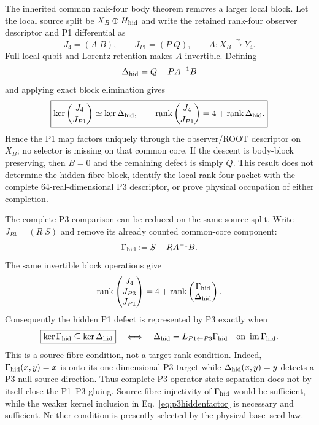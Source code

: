 \documentclass[11pt]{article}
\begin{document}
The inherited common rank-four body theorem removes a larger local block.
Let the local source split be $X_B\oplus H_{\rm hid}$ and write the retained
rank-four observer descriptor and P1 differential as
\begin{equation}
J_4=(A\;B),\qquad J_{P1}=(P\;Q),\qquad A:X_B\overset{\sim}{\longrightarrow}Y_4.
\end{equation}
Full local qubit and Lorentz retention makes $A$ invertible.  Defining
\begin{equation}
\Delta_{\rm hid}=Q-PA^{-1}B
\label{eq:hiddenfiberdefect}
\end{equation}
and applying exact block elimination gives
\begin{equation}
\boxed{
\ker\binom{J_4}{J_{P1}}\simeq\ker\Delta_{\rm hid},\qquad
\operatorname{rank}\binom{J_4}{J_{P1}}
=4+\operatorname{rank}\Delta_{\rm hid}.}
\label{eq:hiddenfiberrank}
\end{equation}
Hence the P1 map factors uniquely through the observer/ROOT descriptor on
$X_B$; no selector is missing on that common core.  If the descent is
body-block preserving, then $B=0$ and the remaining defect is simply $Q$.
This result does not determine the hidden-fibre block, identify the local
rank-four packet with the complete 64-real-dimensional P3 descriptor, or
prove physical occupation of either completion.

The complete P3 comparison can be reduced on the same source split.  Write
$J_{P3}=(R\;S)$ and remove its already counted common-core component:
\begin{equation}
\Gamma_{\rm hid}:=S-RA^{-1}B.
\label{eq:p3hiddenreduction}
\end{equation}
The same invertible block operations give
\begin{equation}
\operatorname{rank}
\begin{pmatrix}J_4\\J_{P3}\\J_{P1}\end{pmatrix}
=4+\operatorname{rank}
\begin{pmatrix}\Gamma_{\rm hid}\\\Delta_{\rm hid}\end{pmatrix}.
\label{eq:p3hiddenrank}
\end{equation}
Consequently the hidden P1 defect is represented by P3 exactly when
\begin{equation}
\boxed{\ker\Gamma_{\rm hid}\subseteq\ker\Delta_{\rm hid}}
\quad\Longleftrightarrow\quad
\Delta_{\rm hid}=L_{P1\leftarrow P3}\Gamma_{\rm hid}
\quad\hbox{on }\operatorname{im}\Gamma_{\rm hid}.
\label{eq:p3hiddenfactor}
\end{equation}
This is a source-fibre condition, not a target-rank condition.  Indeed,
$\Gamma_{\rm hid}(x,y)=x$ is onto its one-dimensional P3 target while
$\Delta_{\rm hid}(x,y)=y$ detects a P3-null source direction.  Thus complete
P3 operator-state separation does not by itself close the P1--P3 gluing.
Source-fibre injectivity of $\Gamma_{\rm hid}$ would be sufficient, while the
weaker kernel inclusion in Eq.~\eqref{eq:p3hiddenfactor} is necessary and
sufficient.  Neither condition is presently selected by the physical
base--seed law.
\end{document}
